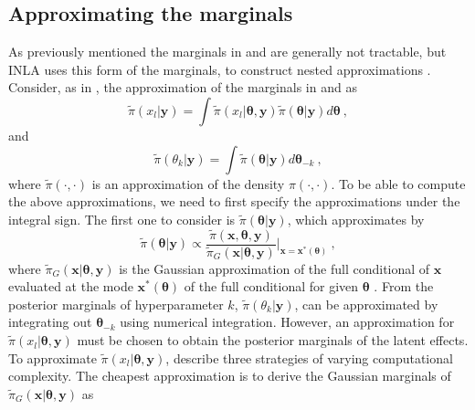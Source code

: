 \subsection{Approximating the marginals}
\label{sec:INLA_marginals_approx}
As previously mentioned the marginals in  and  are generally not tractable, but INLA uses this form of the marginals, to construct nested approximations \citep{rue2009inla}. Consider, as in \citep{rue2009inla}, the approximation of the marginals in  and  as 
\begin{equation}
    \label{eq:INLA_marginals_nested}
    \tilde{\pi}(x_l \lvert \mathbf{y}) = \int \tilde{\pi}(x_l \lvert \boldsymbol{\theta}, \mathbf{y}) \tilde{\pi}(\boldsymbol{\theta} \lvert \mathbf{y}) d\boldsymbol{\theta} \ ,
\end{equation}
and 
\begin{equation}
    \label{eq:INLA_marginals_hyperparameters_nested}
    \tilde{\pi}(\theta_k \lvert \mathbf{y}) = \int \tilde{\pi}(\boldsymbol{\theta} \lvert \mathbf{y}) d\boldsymbol{\theta}_{-k} \ ,
\end{equation}
where $\tilde{\pi}(\cdot, \cdot)$ is an approximation of the density $\pi(\cdot, \cdot)$. To be able to compute the above approximations, we need to first specify the approximations under the integral sign. The first one to consider is $\tilde{\pi}(\boldsymbol{\theta} \lvert \mathbf{y})$, which \citet{rue2009inla} approximates  by 
\begin{equation}
    \label{eq:full_hyper}
    \tilde{\pi}(\boldsymbol{\theta} \lvert \mathbf{y}) \propto \frac{\tilde{\pi}(\mathbf{x}, \boldsymbol{\theta}, \mathbf{y})}{\tilde{\pi}_G(\mathbf{x}\lvert\boldsymbol{\theta}, \mathbf{y})} \bigg\lvert_{\mathbf{x}=\mathbf{x}^*(\boldsymbol{\theta})} \ ,
\end{equation}
where $\tilde{\pi}_G(\mathbf{x}\lvert\boldsymbol{\theta}, \mathbf{y})$ is the Gaussian approximation of the full conditional of $\mathbf{x}$ evaluated at the mode $\mathbf{x}^*(\boldsymbol{\theta})$ of the full conditional for given $\boldsymbol{\theta}$ \citep{rue2009inla}. From  the posterior marginals of hyperparameter $k$, $\tilde{\pi}(\theta_k \lvert \mathbf{y})$, can be approximated by integrating out $\boldsymbol{\theta}_{-k}$ using numerical integration. However, an approximation for $\tilde{\pi}(x_l \lvert \boldsymbol{\theta}, \mathbf{y})$ must be chosen to obtain the posterior marginals of the latent effects. To approximate $\tilde{\pi}(x_l \lvert \boldsymbol{\theta}, \mathbf{y})$, \citep{rue2009inla} describe three strategies of varying computational complexity. The cheapest approximation \citep{gomezrubio2020inla} is to derive the Gaussian marginals of $\tilde{\pi}_G(\mathbf{x}\lvert\boldsymbol{\theta}, \mathbf{y})$ as 
